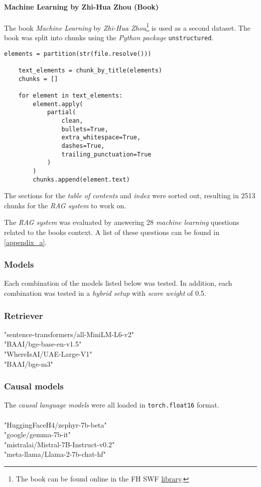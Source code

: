 \documentclass{article}
\begin{document}
\paragraph{Machine Learning by Zhi-Hua Zhou (Book)}
The book \textit{Machine Learning} by \textit{Zhi-Hua Zhou}\footnote{The book can be found online in the FH SWF \href{https://kai.fh-swf.de/permalink/49HBZ_FSW/ou32r9/alma99370954148406441}{library}.} \cite{mlBook} is used as a second dataset. The book was split into chunks using the \textit{Python package} \colorbox{lightgray!25}{\lstinline{unstructured}}.

\begin{lstlisting}[backgroundcolor = \color{lightgray!25}]
elements = partition(str(file.resolve()))

    text_elements = chunk_by_title(elements)
    chunks = []

    for element in text_elements:
        element.apply(
            partial(
                clean,
                bullets=True,
                extra_whitespace=True,
                dashes=True,
                trailing_punctuation=True
            )
        )
        chunks.append(element.text)    
\end{lstlisting}
The sections for the \textit{table of contents} and \textit{index} were sorted out, resulting in 2513 chunks for the \textit{RAG system} to work on.

The \textit{RAG system} was evaluated by answering 28 \textit{machine learning} questions related to the books context. A list of these questions can be found in \cref{appendix_a}.

\subsubsection{Models}
Each combination of the models listed below was tested. In addition, each combination was tested in a \textit{hybrid setup} with \textit{score weight} of 0.5.

\subsubsection*{Retriever}
"sentence-transformers/all-MiniLM-L6-v2"\\ 
"BAAI/bge-base-en-v1.5"\\ 
"WhereIsAI/UAE-Large-V1"\\ 
"BAAI/bge-m3"

\subsubsection*{Causal models}
The \textit{causal language models} were all loaded in \colorbox{lightgray!25}{\lstinline{torch.float16}} format.\\
\\
"HuggingFaceH4/zephyr-7b-beta" \\
"google/gemma-7b-it"\\
"mistralai/Mistral-7B-Instruct-v0.2"\\
"meta-llama/Llama-2-7b-chat-hf"
\end{document}
